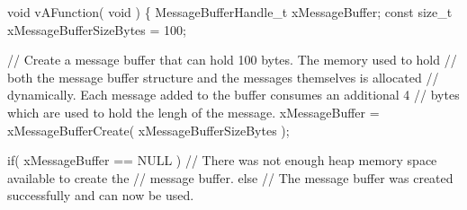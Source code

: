 \begin{DoxyPre}void vAFunction( void )
\{
MessageBufferHandle\_t xMessageBuffer;
const size\_t xMessageBufferSizeBytes = 100;
\begin{DoxyVerb}// Create a message buffer that can hold 100 bytes.  The memory used to hold
// both the message buffer structure and the messages themselves is allocated
// dynamically.  Each message added to the buffer consumes an additional 4
// bytes which are used to hold the lengh of the message.
xMessageBuffer = xMessageBufferCreate( xMessageBufferSizeBytes );

if( xMessageBuffer == NULL )
{
    // There was not enough heap memory space available to create the
    // message buffer.
}
else
{
    // The message buffer was created successfully and can now be used.
}
\end{DoxyVerb}
\end{DoxyPre}



\begin{DoxyPre}\end{DoxyPre}
 